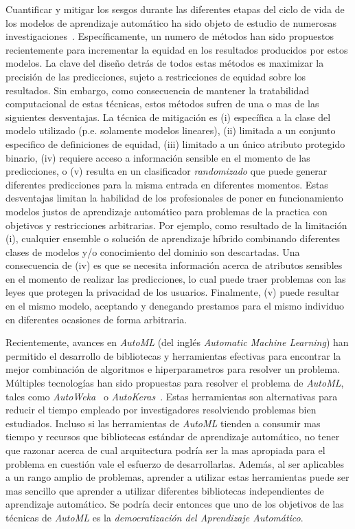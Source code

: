 Cuantificar y mitigar los sesgos durante las diferentes etapas del ciclo de vida de los modelos de aprendizaje automático ha sido objeto de estudio de numerosas investigaciones~\parencite{barocas-hardt-narayanan}.
Específicamente, un numero de métodos han sido propuestos recientemente para incrementar la equidad en los resultados producidos por estos modelos.
La clave del diseño detrás de todos estas métodos es maximizar la precisión de las predicciones, sujeto a restricciones de equidad sobre los resultados.
Sin embargo, como consecuencia de mantener la tratabilidad computacional de estas técnicas, estos métodos sufren de una o mas de las siguientes desventajas.
La técnica de mitigación es
(i) específica a la clase del modelo utilizado (p.e. solamente modelos lineares),
(ii) limitada a un conjunto especifico de definiciones de equidad,
(iii) limitado a un único atributo protegido binario,
(iv) requiere acceso a información sensible en el momento de las predicciones, o
(v) resulta en un clasificador \emph{randomizado} que puede generar diferentes predicciones para la misma entrada en diferentes momentos.
Estas desventajas limitan la habilidad de los profesionales de poner en funcionamiento modelos justos de aprendizaje automático para problemas de la practica con objetivos y restricciones arbitrarias.
Por ejemplo, como resultado de la limitación (i), cualquier ensemble o solución de aprendizaje híbrido combinando diferentes clases de modelos y/o conocimiento del dominio son descartadas.
Una consecuencia de (iv) es que se necesita información acerca de atributos sensibles en el momento de realizar las predicciones, lo cual puede traer problemas con las leyes que protegen la privacidad de los usuarios.
Finalmente, (v) puede resultar en el mismo modelo, aceptando y denegando prestamos para el mismo individuo en diferentes ocasiones de forma arbitraria.


Recientemente, avances en \emph{AutoML} (del inglés \emph{Automatic Machine Learning}) han permitido el desarrollo de bibliotecas y herramientas efectivas para encontrar la mejor combinación de algoritmos e hiperparametros para resolver un problema.
Múltiples tecnologías han sido propuestas para resolver el problema de \emph{AutoML}, tales como \emph{AutoWeka}~\parencite{autoweka} o \emph{AutoKeras}~\parencite{autoKeras}.
Estas herramientas son alternativas para reducir el tiempo empleado por investigadores resolviendo problemas bien estudiados.
Incluso si las herramientas de \emph{AutoML} tienden a consumir mas tiempo y recursos que bibliotecas estándar de aprendizaje automático, no tener que razonar acerca de cual arquitectura podría ser la mas apropiada para el problema en cuestión vale el esfuerzo de desarrollarlas.
Además, al ser aplicables a un rango amplio de problemas, aprender a utilizar estas herramientas puede ser mas sencillo que aprender a utilizar diferentes bibliotecas independientes de aprendizaje automático.
Se podría decir entonces que uno de los objetivos de las técnicas de \emph{AutoML} es la \emph{democratización del Aprendizaje Automático}.

